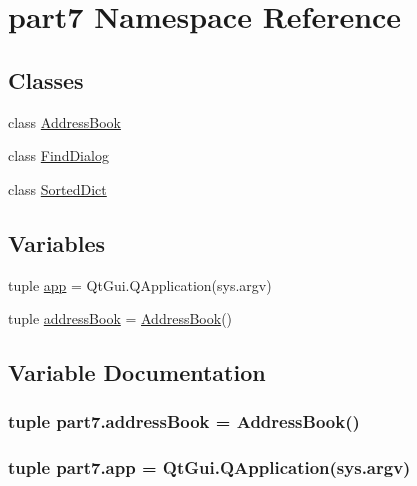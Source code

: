 \hypertarget{namespacepart7}{}\section{part7 Namespace Reference}
\label{namespacepart7}
\subsection*{Classes}
\begin{DoxyCompactItemize}
\item 
class \hyperlink{classpart7_1_1AddressBook}{Address\+Book}
\item 
class \hyperlink{classpart7_1_1FindDialog}{Find\+Dialog}
\item 
class \hyperlink{classpart7_1_1SortedDict}{Sorted\+Dict}
\end{DoxyCompactItemize}
\subsection*{Variables}
\begin{DoxyCompactItemize}
\item 
tuple \hyperlink{namespacepart7_a01dec608641deca3e4a4c8174fea86b7}{app} = Qt\+Gui.\+Q\+Application(sys.\+argv)
\item 
tuple \hyperlink{namespacepart7_a740a5fd1f54f3d851363af123d47346d}{address\+Book} = \hyperlink{classpart7_1_1AddressBook}{Address\+Book}()
\end{DoxyCompactItemize}


\subsection{Variable Documentation}
\hypertarget{namespacepart7_a740a5fd1f54f3d851363af123d47346d}{}
\subsubsection[{address\+Book}]{\setlength{\rightskip}{0pt plus 5cm}tuple part7.\+address\+Book = {\bf Address\+Book}()}\label{namespacepart7_a740a5fd1f54f3d851363af123d47346d}
\hypertarget{namespacepart7_a01dec608641deca3e4a4c8174fea86b7}{}
\subsubsection[{app}]{\setlength{\rightskip}{0pt plus 5cm}tuple part7.\+app = Qt\+Gui.\+Q\+Application(sys.\+argv)}\label{namespacepart7_a01dec608641deca3e4a4c8174fea86b7}
